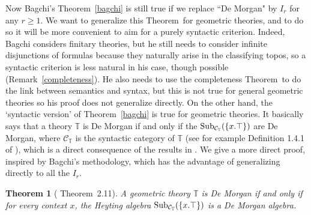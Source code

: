 \documentclass{article}
\newtheorem{theorem}{Theorem}
\newcommand{\T}{\mathbb{T}}
\begin{document}
Now Bagchi's Theorem~\ref{bagchi} is still true if we replace ``De Morgan" by $I_r$ for any $r\geq 1$. We want to generalize this Theorem~for geometric theories, and to do so it will be more convenient to aim for a purely syntactic criterion. Indeed, Bagchi considers finitary theories, but he still needs to consider infinite disjunctions of formulas because they naturally arise in the classifying topos, so a syntactic criterion is less natural in his case, though possible (Remark~\ref{completeness}). He also needs to use the completeness Theorem~to do the link between semantics and syntax, but this is not true for general geometric theories so his proof does not generalize directly. On the other hand, the `syntactic version' of Theorem~\ref{bagchi} is true for geometric theories. It basically says that a theory $\mathbb{T}$ is De Morgan if and only if the $\textup{Sub}_{\mathcal{C}_\mathbb{T}}(\{x.\top\})$ are De Morgan, where $\mathcal{C}_\T$ is the syntactic category of $\T$ (see for example Definition 1.4.1 of \cite{caramello2018theories}), which is a direct consequence of the results in \cite{caramello2009morgan}. We give a more direct proof, inspired by Bagchi's methodology, which has the advantage of generalizing directly to all the $I_r$.
\begin{theorem}[\cite{caramello2009morgan} Theorem~2.11]\label{dmltheory}
    A geometric theory $\mathbb{T}$ is De Morgan if and only if for every context $x$, the Heyting algebra $\textup{Sub}_{\mathcal{C}_\mathbb{T}}(\{x.\top\})$ is a De Morgan algebra.
\end{theorem}
\end{document}
